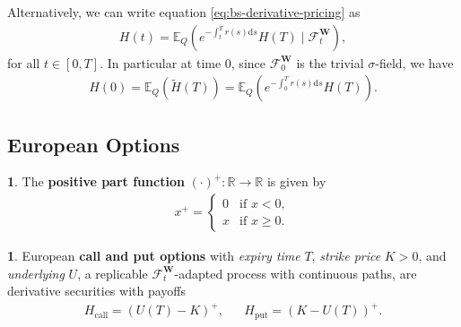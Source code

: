 \documentclass[english]{article}
\numberwithin{equation}{section}
\numberwithin{figure}{section}
\theoremstyle{bolddescit}
\theoremstyle{definition}
\newtheorem{definition}[theorem]{\protect\definitionname}
\theoremstyle{definition}
\theoremstyle{plain}
\theoremstyle{plain}
\theoremstyle{bolddesc}
\theoremstyle{plain}
\theoremstyle{remark}
\providecommand{\definitionname}{Definition}
\begin{document}
Alternatively, we can write equation \eqref{eq:bs-derivative-pricing} as
\begin{align*}
  H(t) = \mathbb{E}_Q\left(e^{-\int_t^T r(s) \mathrm{d}s} H(T) \mid \mathcal{F}^\mathbf{W}_t\right),
\end{align*}
for all $t \in [0,T]$. In particular at time 0, since $\mathcal{F}^\mathbf{W}_0$ is the trivial $\sigma$-field, we have
\begin{align*}
  H(0) = \mathbb{E}_Q\left(\widetilde{H}(T)\right)
  = \mathbb{E}_Q\left(e^{-\int_0^T r(s) \mathrm{d}s} H(T)\right).
\end{align*}

\subsection{European Options}

\begin{definition}
  The \textbf{positive part function} $(\cdot)^+ : \mathbb{R} \to \mathbb{R}$ is given by
  \begin{align*}
    x^+ = \left\{\begin{array}{ll}
      0 & \text{if } x < 0,\\
      x & \text{if } x \ge 0.
    \end{array}\right.
  \end{align*}
\end{definition}

\begin{definition}
  European \textbf{call and put options} with \textit{expiry time} $T$, \textit{strike price} $K > 0$, and \textit{underlying} $U$, a replicable $\mathcal{F}^\mathbf{W}_t$-adapted process with continuous paths, are derivative securities with payoffs
  \begin{align*}
    H_\text{call} = (U(T) - K)^+, && H_\text{put} = (K - U(T))^+.
  \end{align*}
\end{definition}
\end{document}
